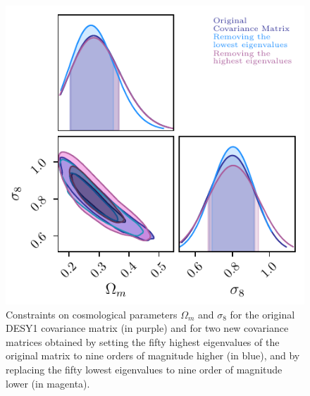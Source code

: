\documentclass[twocolumn]{\docclass}
\begin{document}
	
	\begin{figure}
		\includegraphics[width=0.9\columnwidth]{Eigenvalues/Eigenvalues_wm-sigma8.pdf}
		\caption{Constraints on cosmological parameters $\Omega_m$ and $\sigma_8$ for the original DESY1 covariance matrix (in purple) and for two new covariance matrices obtained by setting the fifty highest eigenvalues of the original matrix to nine orders of magnitude higher (in blue), and by replacing the fifty lowest eigenvalues to nine order of magnitude lower (in magenta). \label{fig:eigenvalues}}
	\end{figure}
	
\end{document}
